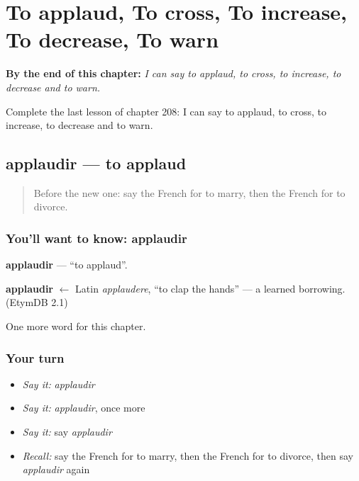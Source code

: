 
\chapter{To applaud, To cross, To increase, To decrease, To warn}
\label{ch:fr-to-applaud-to-cross-to-increase-to-decrease-to-warn}

\begin{chapteropening}
\textbf{By the end of this chapter:} \emph{I can say to applaud, to cross, to increase, to decrease and to warn.}

Complete the last lesson of chapter 208: I can say to applaud, to cross, to increase, to decrease and to warn.
\end{chapteropening}

\section[applaudir]{applaudir — to applaud}

\label{lesson:FR-C208-applaudir}



\begin{quote}
Before the new one: say the French for to marry, then the French for to divorce.
\end{quote}

\subsection*{You'll want to know: applaudir}
\textbf{applaudir} — \textquotedblleft{}to applaud\textquotedblright{}.

\begin{cousinweb}
\textbf{applaudir} $\leftarrow$ Latin \emph{applaudere}, \textquotedblleft{}to clap the hands\textquotedblright{} — a learned borrowing. (EtymDB 2.1)
\end{cousinweb}

\begin{grammarlens}[title={What you've built}]
One more word for this chapter.
\end{grammarlens}

\subsection*{Your turn}
\begin{itemize}
\raggedright
  \item \emph{Say it:} \emph{applaudir}
  \item \emph{Say it:} \emph{applaudir}, once more
  \item \emph{Say it:} say \emph{applaudir}
  \item \emph{Recall:} say the French for to marry, then the French for to divorce, then say \emph{applaudir} again
\end{itemize}

